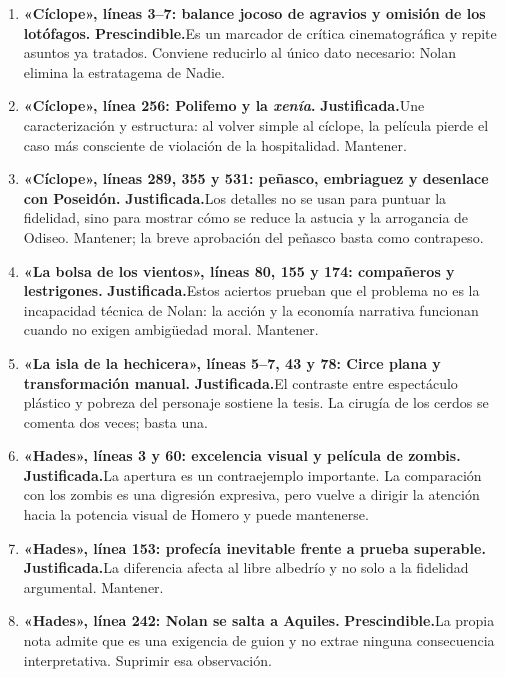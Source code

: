 \documentclass[11pt,a4paper]{article}
\newcommand{\justificada}{\textbf{Justificada.}}
\newcommand{\prescindible}{\textbf{Prescindible.}}
\begin{document}
\begin{enumerate}
\item \textbf{«Cíclope», líneas 3--7: balance jocoso de agravios y omisión de los lotófagos.} \prescindible Es un marcador de crítica cinematográfica y repite asuntos ya tratados. Conviene reducirlo al único dato necesario: Nolan elimina la estratagema de Nadie.

\item \textbf{«Cíclope», línea 256: Polifemo y la \emph{xenía}.} \justificada Une caracterización y estructura: al volver simple al cíclope, la película pierde el caso más consciente de violación de la hospitalidad. Mantener.

\item \textbf{«Cíclope», líneas 289, 355 y 531: peñasco, embriaguez y desenlace con Poseidón.} \justificada Los detalles no se usan para puntuar la fidelidad, sino para mostrar cómo se reduce la astucia y la arrogancia de Odiseo. Mantener; la breve aprobación del peñasco basta como contrapeso.

\item \textbf{«La bolsa de los vientos», líneas 80, 155 y 174: compañeros y lestrigones.} \justificada Estos aciertos prueban que el problema no es la incapacidad técnica de Nolan: la acción y la economía narrativa funcionan cuando no exigen ambigüedad moral. Mantener.

\item \textbf{«La isla de la hechicera», líneas 5--7, 43 y 78: Circe plana y transformación manual.} \justificada El contraste entre espectáculo plástico y pobreza del personaje sostiene la tesis. La cirugía de los cerdos se comenta dos veces; basta una.

\item \textbf{«Hades», líneas 3 y 60: excelencia visual y película de zombis.} \justificada La apertura es un contraejemplo importante. La comparación con los zombis es una digresión expresiva, pero vuelve a dirigir la atención hacia la potencia visual de Homero y puede mantenerse.

\item \textbf{«Hades», línea 153: profecía inevitable frente a prueba superable.} \justificada La diferencia afecta al libre albedrío y no solo a la fidelidad argumental. Mantener.

\item \textbf{«Hades», línea 242: Nolan se salta a Aquiles.} \prescindible La propia nota admite que es una exigencia de guion y no extrae ninguna consecuencia interpretativa. Suprimir esa observación.


\end{enumerate}
\end{document}

